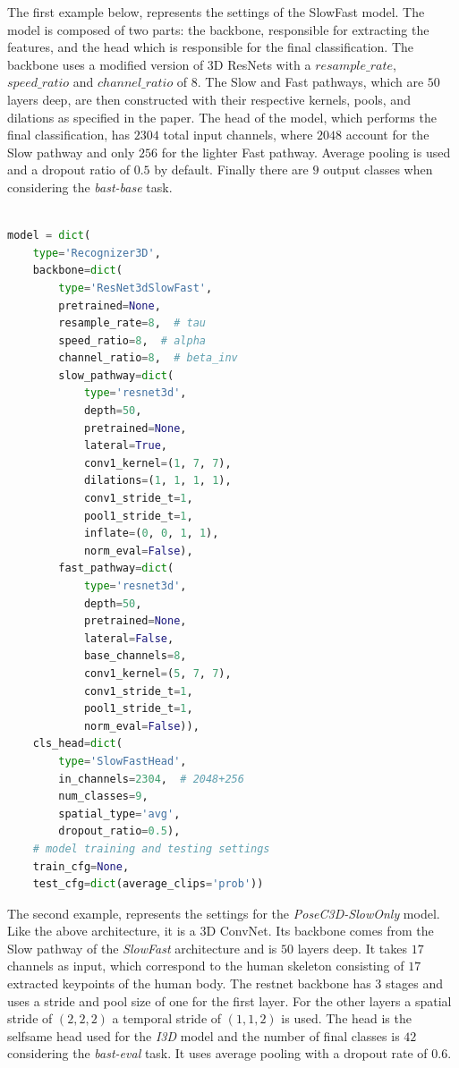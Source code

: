\documentclass[extern,palatino]{cgMA}
\begin{document}
\bigskip
\noindent The first example below, represents the settings of the SlowFast model. The model is composed of two parts: the backbone, responsible for extracting the features, and the head which is responsible for the final classification. The backbone uses a modified version of 3D ResNets with a $resample\_rate$, $speed\_ratio$ and $channel\_ratio$ of $8$. The Slow and Fast pathways, which are $50$ layers deep, are then constructed with their respective kernels, pools, and dilations as specified in the paper. The head of the model, which performs the final classification, has $2304$ total input channels, where $2048$ account for the Slow pathway and only $256$ for the lighter Fast pathway. Average pooling is used and a dropout ratio of $0.5$ by default. Finally there are $9$ output classes when considering the \textit{bast-base} task.

\vspace{5mm}
\begin{lstlisting}[language=Python, label={listing_slowfast_model}, caption={SlowFast model settings}]

model = dict(
    type='Recognizer3D',
    backbone=dict(
        type='ResNet3dSlowFast',
        pretrained=None,
        resample_rate=8,  # tau
        speed_ratio=8,  # alpha
        channel_ratio=8,  # beta_inv
        slow_pathway=dict(
            type='resnet3d',
            depth=50,
            pretrained=None,
            lateral=True,
            conv1_kernel=(1, 7, 7),
            dilations=(1, 1, 1, 1),
            conv1_stride_t=1,
            pool1_stride_t=1,
            inflate=(0, 0, 1, 1),
            norm_eval=False),
        fast_pathway=dict(
            type='resnet3d',
            depth=50,
            pretrained=None,
            lateral=False,
            base_channels=8,
            conv1_kernel=(5, 7, 7),
            conv1_stride_t=1,
            pool1_stride_t=1,
            norm_eval=False)),
    cls_head=dict(
        type='SlowFastHead',
        in_channels=2304,  # 2048+256
        num_classes=9,
        spatial_type='avg',
        dropout_ratio=0.5),
    # model training and testing settings
    train_cfg=None,
    test_cfg=dict(average_clips='prob'))

\end{lstlisting}
\vspace{5mm}

\bigskip \bigksip
\noindent The second example, represents the settings for the \textit{PoseC3D-SlowOnly} model. Like the above architecture, it is a 3D ConvNet. Its backbone comes from the Slow pathway of the \textit{SlowFast} architecture and is $50$ layers deep. It takes $17$ channels as input, which correspond to the human skeleton consisting of $17$ extracted keypoints of the human body. The restnet backbone has 3 stages and uses a stride and pool size of one for the first layer. For the other layers a spatial stride of $(2, 2, 2)$ a temporal stride of $(1, 1, 2)$ is used. The head is the selfsame head used for the \textit{I3D} model and the number of final classes is $42$ considering the \textit{bast-eval} task. It uses average pooling with a dropout rate of 0.6.
\end{document}

